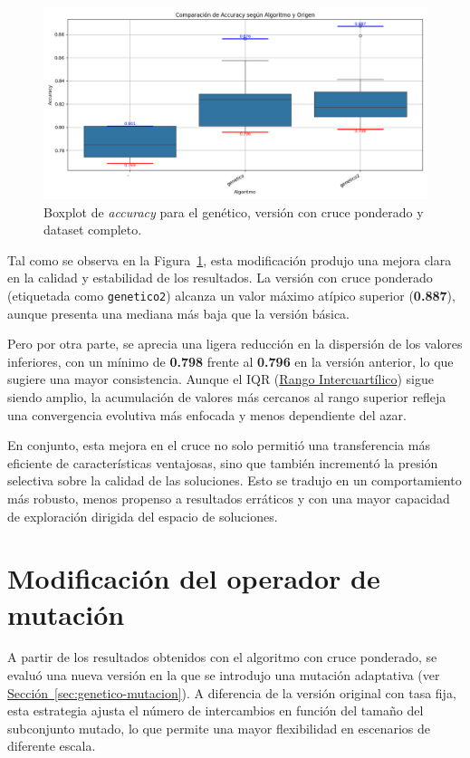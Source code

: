 \begin{figure}[H]
    \centering
    \includegraphics[width=1\textwidth]{imagenes/evaluaciones/operador-de-cruce}
    \caption{Boxplot de \textit{accuracy} para el genético, versión con cruce ponderado y dataset completo.}
    \label{fig:cruce_ponderado}
\end{figure}

Tal como se observa en la Figura~\ref{fig:cruce_ponderado}, esta modificación produjo una mejora clara en la calidad y estabilidad de los resultados.
La versión con cruce ponderado (etiquetada como \texttt{genetico2}) alcanza un valor máximo atípico superior (\textbf{0.887}),
aunque presenta una mediana más baja que la versión básica.

Pero por otra parte, se aprecia una ligera reducción en la dispersión de los valores inferiores,
con un mínimo de \textbf{0.798} frente al \textbf{0.796} en la versión anterior, lo que sugiere una mayor consistencia.
Aunque el IQR (\hyperref[subsec:visualizacion-de-resultados]{Rango Intercuartílico}) sigue siendo amplio,
la acumulación de valores más cercanos al rango superior refleja una convergencia evolutiva más enfocada y menos dependiente del azar.

En conjunto, esta mejora en el cruce no solo permitió una transferencia más eficiente de características ventajosas,
sino que también incrementó la presión selectiva sobre la calidad de las soluciones.
Esto se tradujo en un comportamiento más robusto, menos propenso a resultados erráticos y con una mayor capacidad de exploración dirigida del espacio de soluciones.


\section{Modificación del operador de mutación}\label{sec:modificacion-mutacion}
A partir de los resultados obtenidos con el algoritmo con cruce ponderado, se evaluó una nueva versión en la que se introdujo una mutación adaptativa
(ver \hyperref[sec:genetico-mutacion]{Sección~\ref*{sec:genetico-mutacion}}).
A diferencia de la versión original con tasa fija, esta estrategia ajusta el número de intercambios en función del tamaño del subconjunto mutado,
lo que permite una mayor flexibilidad en escenarios de diferente escala.


